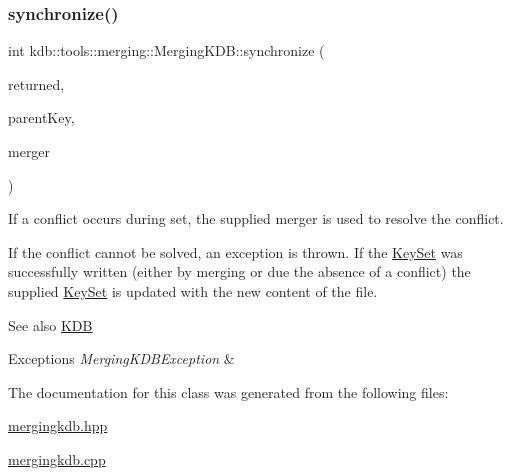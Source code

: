 \subsubsection{\texorpdfstring{synchronize()}{synchronize()}\hspace{0.1cm}{\footnotesize\ttfamily [2/2]}}
{\footnotesize\ttfamily int kdb\+::tools\+::merging\+::\+Merging\+K\+D\+B\+::synchronize (\begin{DoxyParamCaption}\item[{\hyperlink{classkdb_1_1KeySet}{Key\+Set} \&}]{returned,  }\item[{\hyperlink{classkdb_1_1Key}{Key} \&}]{parent\+Key,  }\item[{Three\+Way\+Merge \&}]{merger }\end{DoxyParamCaption})\hspace{0.3cm}{\ttfamily [virtual]}}



If a conflict occurs during set, the supplied merger is used to resolve the conflict. 

If the conflict cannot be solved, an exception is thrown. If the \hyperlink{classkdb_1_1KeySet}{Key\+Set} was successfully written (either by merging or due the absence of a conflict) the supplied \hyperlink{classkdb_1_1KeySet}{Key\+Set} is updated with the new content of the file.

\begin{DoxySeeAlso}{See also}
\hyperlink{classkdb_1_1KDB}{K\+DB} 
\end{DoxySeeAlso}

\begin{DoxyExceptions}{Exceptions}
{\em Merging\+K\+D\+B\+Exception} & \\
\hline
\end{DoxyExceptions}


The documentation for this class was generated from the following files\+:\begin{DoxyCompactItemize}
\item 
\hyperlink{mergingkdb_8hpp}{mergingkdb.\+hpp}\item 
\hyperlink{mergingkdb_8cpp}{mergingkdb.\+cpp}\end{DoxyCompactItemize}
